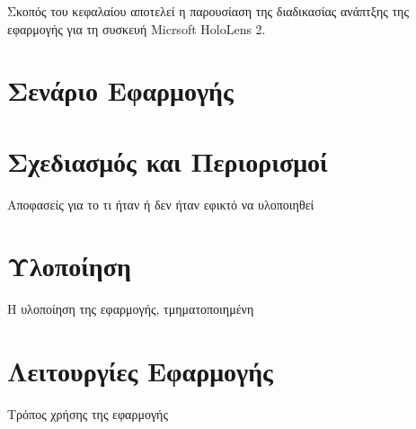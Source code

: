 
Σκοπός του κεφαλαίου αποτελεί η παρουσίαση της διαδικασίας ανάπτξης της εφαρμογής για τη συσκευή Micrsoft HoloLens 2.

\section{Σενάριο Εφαρμογής}\label{sec:appScenario}


\section{Σχεδιασμός και Περιορισμοί}\label{sec:appDesignAndLimitations}
Αποφασείς για το τι ήταν ή δεν ήταν εφικτό να υλοποιηθεί

\section{Υλοποίηση}\label{sec:appImplementation}
Η υλοποίηση της εφαρμογής, τμηματοποιημένη

\section{Λειτουργίες Εφαρμογής}\label{sec:appFunctionalities}
Τρόπος χρήσης της εφαρμογής

